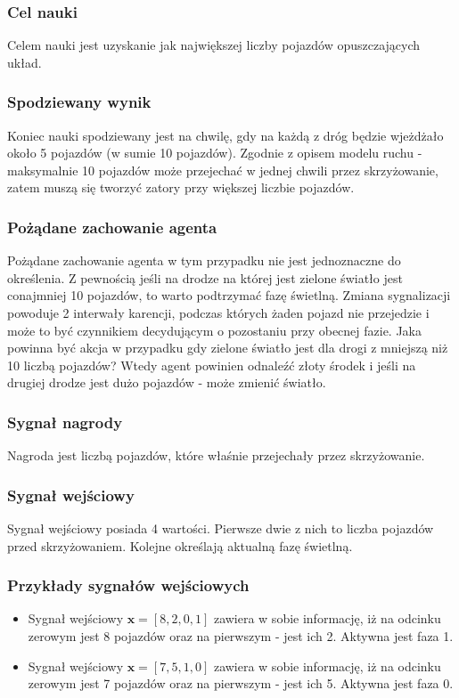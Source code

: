 \documentclass[12pt]{book}
\theoremstyle{plain}
\begin{document}
\subsubsection{Cel nauki}
Celem nauki jest uzyskanie jak największej liczby pojazdów opuszczających układ.
\subsubsection{Spodziewany wynik}
Koniec nauki spodziewany jest na chwilę, gdy na każdą z dróg będzie wjeżdżało około 5 pojazdów (w sumie 10 pojazdów). Zgodnie z opisem modelu ruchu - maksymalnie 10 pojazdów może przejechać w jednej chwili przez skrzyżowanie, zatem muszą się tworzyć zatory przy większej liczbie pojazdów.
\subsubsection{Pożądane zachowanie agenta}
Pożądane zachowanie agenta w tym przypadku nie jest jednoznaczne do określenia. Z pewnością jeśli na drodze na której jest zielone światło jest conajmniej 10 pojazdów, to warto podtrzymać fazę świetlną. Zmiana sygnalizacji powoduje 2 interwały karencji, podczas których żaden pojazd nie przejedzie i może to być czynnikiem decydującym o pozostaniu przy obecnej fazie. Jaka powinna być akcja w przypadku gdy zielone światło jest dla drogi z mniejszą niż 10 liczbą pojazdów? Wtedy agent powinien odnaleźć złoty środek i jeśli na drugiej drodze jest dużo pojazdów - może zmienić światło.
\subsubsection*{Sygnał nagrody}
Nagroda jest liczbą pojazdów, które właśnie przejechały przez skrzyżowanie.
\subsubsection*{Sygnał wejściowy}
Sygnał wejściowy posiada 4 wartości. Pierwsze dwie z nich to liczba pojazdów przed skrzyżowaniem. Kolejne określają aktualną fazę świetlną.
\subsubsection*{Przykłady sygnałów wejściowych}
\begin{itemize}
	\item Sygnał wejściowy $ \textbf{x}=[8,2,0,1] $ zawiera w sobie informację, iż na odcinku zerowym jest 8 pojazdów oraz na pierwszym - jest ich 2. Aktywna jest faza 1.
		\item Sygnał wejściowy $ \textbf{x}=[7,5,1,0] $ zawiera w sobie informację, iż na odcinku zerowym jest 7 pojazdów oraz na pierwszym - jest ich 5. Aktywna jest faza 0.
\end{itemize}
\end{document}
